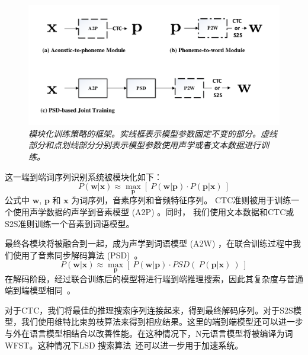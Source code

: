 \begin{figure}
  \centering
    \includegraphics[width=\linewidth]{figure/psd_mod_framework.pdf}
    \caption{\it 模块化训练策略的框架。实线框表示模型参数固定不变的部分。虚线部分和点划线部分分别表示模型参数使用声学或者文本数据进行训练。}
    \label{fig:psd_mod_framework}
\end{figure}

这一端到端词序列识别系统被模块化如下：
\begin{equation}
\label{equ:framework-1}
P(\mathbf{w}|\mathbf{x})\approx\max_{\mathbf{p}} \left[\ P(\mathbf{w}|\mathbf{p}) \cdot P(\mathbf{p}|\mathbf{x})\ \right]
\end{equation}
公式中 $\mathbf{w}$, $\mathbf{p}$ 和 $\mathbf{x}$ 为词序列，音素序列和音频特征序列。
CTC准则被用于训练一个使用声学数据的声学到音素模型 (A2P)  。同时， 我们使用文本数据和CTC或S2S准则训练一个音素到词语模型。

最终各模块将被融合到一起，成为声学到词语模型 (A2W) ，在联合训练过程中我们使用了音素同步解码算法 (PSD)~\cite{zhc00-chen-tasl2017}。
\begin{equation}
\label{equ:framework-2}
P(\mathbf{w}|\mathbf{x})\approx \max_{\mathbf{p}}\left[\ P(\mathbf{w}|\mathbf{p}) \cdot PSD(\ P(\mathbf{p}|\mathbf{x})\ )\ \right]
\end{equation}
在解码阶段，经过联合训练后的模型将进行端到端推理搜索，因此其复杂度与普通端到端模型相同~\cite{audhkhasi2017direct}。

对于CTC，我们将最佳的推理搜索序列连接起来，得到最终解码序列。对于S2S模型，我们使用维特比束剪枝算法来得到相应结果。这里的端到端模型还可以进一步与外在语言模型相结合以改善性能。在这种情况下，N元语言模型将被编译为词WFST。这种情况下LSD 搜索算法~\cite{zhc00-chen-tasl2017}还可以进一步用于加速系统。


